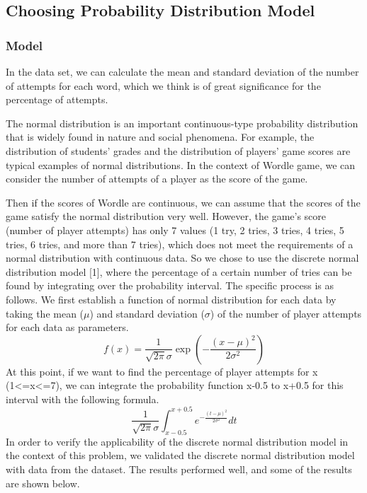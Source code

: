 \documentclass[12pt]{article}  %
\begin{document}
\subsection{Choosing Probability Distribution Model}
\subsubsection{Model}
In the data set, we can calculate the mean and standard deviation of the number of attempts for each word, which we think is of great significance for the percentage of attempts.
	
The normal distribution is an important continuous-type probability distribution that is widely found in nature and social phenomena. For example, the distribution of students' grades and the distribution of players' game scores are typical examples of normal distributions. In the context of Wordle game, we can consider the number of attempts of a player as the score of the game.

Then if the scores of Wordle are continuous, we can assume that the scores of the game satisfy the normal distribution very well.
	However, the game's score (number of player attempts) has only 7 values (1 try, 2 tries, 3 tries, 4 tries, 5 tries, 6 tries, and more than 7 tries), which does not meet the requirements of a normal distribution with continuous data. So we chose to use the discrete normal distribution model [1], where the percentage of a certain number of tries can be found by integrating over the probability interval.
	The specific process is as follows.
We first establish a function of normal distribution for each data by taking the mean ($\mu$) and standard deviation ($\sigma$) of the number of player attempts for each data as parameters.
\begin{equation}
	f(x)=\frac{1}{\sqrt{2\pi}\sigma}\exp(-\frac{(x-\mu)^2}{2\sigma^2})
\end{equation}
At this point, if we want to find the percentage of player attempts for x (1<=x<=7), we can integrate the probability function x-0.5 to x+0.5 for this interval with the following formula.
\begin{equation}
	\frac{1}{\sqrt{2\pi}\sigma}\int^{x+0.5}_{x-0.5}e^{-\frac{(t-\mu)^2}{2\sigma^2}}dt
\end{equation}
In order to verify the applicability of the discrete normal distribution model in the context of this problem, we validated the discrete normal distribution model with data from the dataset. The results performed well, and some of the results are shown below.
\end{document}
